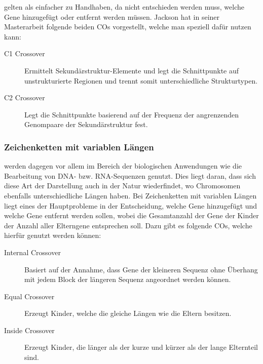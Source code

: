 		gelten als einfacher zu Handhaben, da nicht entschieden werden muss, welche Gene hinzugefügt oder entfernt werden müssen. Jackson hat in seiner Masterarbeit \cite{COProteins} folgende beiden COs vorgestellt, welche man speziell dafür nutzen kann:
		
		\begin{description}
			\item[C1 Crossover] Ermittelt Sekundärstruktur-Elemente und legt die Schnittpunkte auf unstrukturierte Regionen und trennt somit unterschiedliche Strukturtypen.
			\item[C2 Crossover] Legt die Schnittpunkte basierend auf der Frequenz der angrenzenden Genompaare der Sekundärstruktur fest.
		\end{description}
	
	\subsubsection{Zeichenketten mit variablen Längen}
	
		werden dagegen vor allem im Bereich der biologischen Anwendungen wie die Bearbeitung von DNA- bzw. RNA-Sequenzen genutzt. Dies liegt daran, dass sich diese Art der Darstellung auch in der Natur wiederfindet, wo Chromosomen ebenfalls unterschiedliche Längen haben. Bei Zeichenketten mit variablen Längen liegt eines der Hauptprobleme in der Entscheidung, welche Gene hinzugefügt und welche Gene entfernt werden sollen, wobei die Gesamtanzahl der Gene der Kinder der Anzahl aller Elterngene entsprechen soll. Dazu gibt es \zB folgende COs, welche hierfür genutzt werden können:
		
		\begin{description}
			\item[Internal Crossover] Basiert auf der Annahme, dass Gene der kleineren Sequenz ohne Überhang mit jedem Block der längeren Sequenz angeordnet werden können. \cite{UnequalCO}
			\item[Equal Crossover] Erzeugt Kinder, welche die gleiche Längen wie die Eltern besitzen. \cite{UnqeualLengthCO}
			\item[Inside Crossover] Erzeugt Kinder, die länger als der kurze und kürzer als der lange Elternteil sind. \cite{UnqeualLengthCO}
		\end{description}